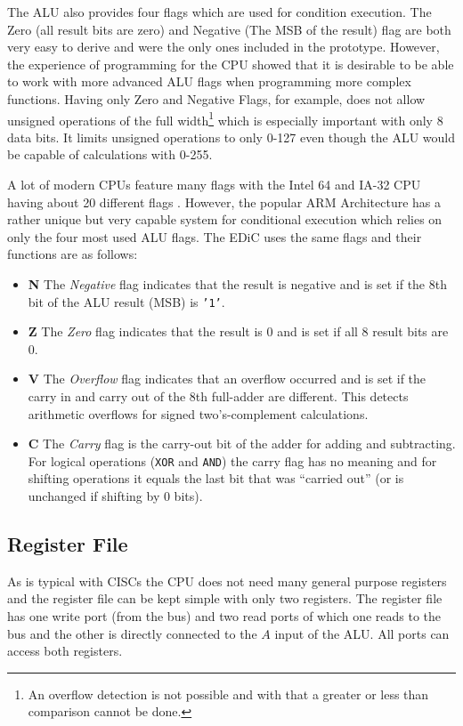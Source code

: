 The \gls{ALU} also provides four flags which are used for condition execution.
The Zero (all result bits are zero) and Negative (The \gls{MSB} of the result) flag are both very easy to derive and were the only ones included in the prototype.
However, the experience of programming for the \gls{CPU} showed that it is desirable to be able to work with more advanced \gls{ALU} flags when programming more complex functions.
Having only Zero and Negative Flags, for example, does not allow unsigned operations of the full width\footnote{An overflow detection is not possible and with that a greater or less than comparison cannot be done.} which is especially important with only 8 data bits.
It limits unsigned operations to only 0-127 even though the \gls{ALU} would be capable of calculations with 0-255.

A lot of modern \glspl{CPU} feature many flags with the Intel 64\textsuperscript{\textregistered} and IA-32 \gls{CPU} having about 20 different flags \cite[Section~3.4.3]{intelx86}.
However, the popular ARM Architecture has a rather unique but very capable system for conditional execution which relies on only the four most used \gls{ALU} flags.
The \gls{EDiC} uses the same flags and their functions are as follows:
\begin{itemize}
  \item \textbf{N} The \emph{Negative} flag indicates that the result is negative and is set if the 8th bit of the \gls{ALU} result (\gls{MSB}) is \texttt{'1'}.
  \item \textbf{Z} The \emph{Zero} flag indicates that the result is 0 and is set if all 8 result bits are 0.
  \item \textbf{V} The \emph{Overflow} flag indicates that an overflow occurred and is set if the carry in and carry out of the 8th full-adder are different.
  This detects arithmetic overflows for signed two's-complement calculations.
  \item \textbf{C} The \emph{Carry} flag is the carry-out bit of the adder for adding and subtracting.
  For logical operations (\texttt{XOR} and \texttt{AND}) the carry flag has no meaning and for shifting operations it equals the last bit that was ``carried out'' (or is unchanged if shifting by 0 bits).
\end{itemize}
\subsection{Register File}\label{sec:regs}
As is typical with \glspl{CISC} the \gls{CPU} does not need many general purpose registers and the register file can be kept simple with only two registers.
The register file has one write port (from the bus) and two read ports of which one reads to the bus and the other is directly connected to the $A$ input of the \gls{ALU}.
All ports can access both registers.
